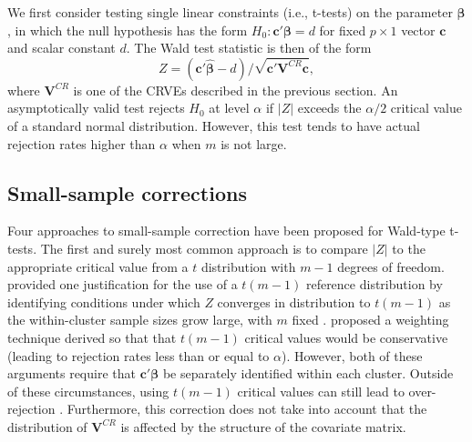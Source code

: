 \documentclass[12pt]{article}\usepackage[]{graphicx}\usepackage[]{color}
\newcommand{\bm}{\mathbf}
\newcommand{\bs}{\boldsymbol}
\begin{document}
We first consider testing single linear constraints (i.e., t-tests) on the parameter $\bs\beta$, in which the null hypothesis has the form $H_0: \bm{c}'\bs\beta = d$ for fixed $p \times 1$ vector $\bm{c}$ and scalar constant $d$. 
The Wald test statistic is then of the form 
\begin{equation}
\label{eq:Wald_z}
Z = \left(\bm{c}'\bs{\hat\beta} - d\right) / \sqrt{\bm{c}'\bm{V}^{CR}\bm{c}},
\end{equation}
where $\bm{V}^{CR}$ is one of the CRVEs described in the previous section. 
An asymptotically valid test rejects $H_0$ at level $\alpha$ if $|Z|$ exceeds the $\alpha / 2$ critical value of a standard normal distribution. 
However, this test tends to have actual rejection rates higher than $\alpha$ when $m$ is not large. 

\subsection{Small-sample corrections}

Four approaches to small-sample correction have been proposed for Wald-type t-tests. 
The first and surely most common approach is to compare $|Z|$ to the appropriate critical value from a $t$ distribution with $m - 1$ degrees of freedom. 
\citet{Hansen2007asymptotic} provided one justification for the use of a $t(m-1)$ reference distribution by identifying conditions under which $Z$ converges in distribution to $t(m-1)$ as the within-cluster sample sizes grow large, with $m$ fixed \citep[see also][]{Donald2007inference}. 
\citet{Ibragimov2010tstatistic} proposed a weighting technique derived so that that $t(m-1)$ critical values would be conservative (leading to rejection rates less than or equal to $\alpha$).
However, both of these arguments require that $\bm{c}'\bs\beta$ be separately identified within each cluster. 
Outside of these circumstances, using $t(m-1)$ critical values can still lead to over-rejection \citep{Cameron2015practitioners}. 
Furthermore, this correction does not take into account that the distribution of $\bm{V}^{CR}$ is affected by the structure of the covariate matrix. 
\end{document}

